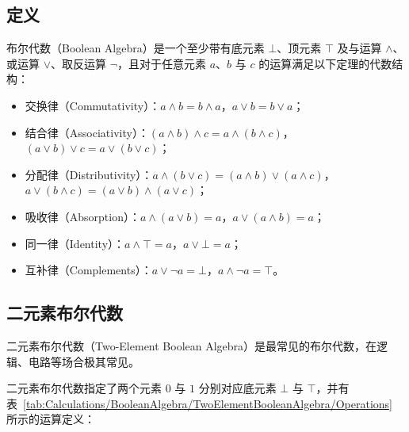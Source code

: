     \subsection{定义}\label{subsec:Calculations/BooleanAlgebra/Definition}
        布尔代数（Boolean Algebra）是一个至少带有底元素 $\bot$、顶元素 $\top$ 及与运算 $\wedge$、或运算 $\vee$、取反运算 $\neg$，且对于任意元素 $a$、$b$ 与 $c$ 的运算满足以下定理的代数结构：
        \begin{itemize}
            \item 交换律（Commutativity）：$a \wedge b = b \wedge a$，$a \vee b = b \vee a$；
            \item 结合律（Associativity）：$(a \wedge b) \wedge c = a \wedge (b \wedge c)$，$(a \vee b) \vee c = a \vee (b \vee c)$；
            \item 分配律（Distributivity）：$a \wedge (b \vee c) = (a \wedge b) \vee (a \wedge c)$，$a \vee (b \wedge c) = (a \vee b) \wedge (a \vee c)$；
            \item 吸收律（Absorption）：$a \wedge (a \vee b) = a$，$a \vee (a \wedge b) = a$；
            \item 同一律（Identity）：$a \wedge \top = a$，$a \vee \bot = a$；
            \item 互补律（Complements）：$a \vee \neg a = \bot$，$a \wedge \neg a = \top$。
        \end{itemize}

    \subsection{二元素布尔代数}\label{subsec:Calculations/BooleanAlgebra/TwoElementBooleanAlgebra}
        二元素布尔代数（Two-Element Boolean Algebra）是最常见的布尔代数，在逻辑、电路等场合极其常见。

        二元素布尔代数指定了两个元素 $0$ 与 $1$ 分别对应底元素 $\bot$ 与 $\top$，并有表~\ref{tab:Calculations/BooleanAlgebra/TwoElementBooleanAlgebra/Operations} 所示的运算定义：

